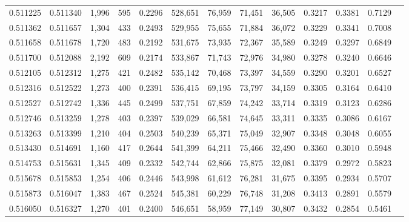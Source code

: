 \begin{tabular}{rrrrrrrrrrrrr}
0.511225 & 0.511340 &  1,996 &   595 &                                     0.2296 & 528,651 &  76,959 &  71,451 &  36,505 & 0.3217 & 0.3381 & 0.7129 \\
0.511362 & 0.511657 &  1,304 &   433 &                                     0.2493 & 529,955 &  75,655 &  71,884 &  36,072 & 0.3229 & 0.3341 & 0.7008 \\
0.511658 & 0.511678 &  1,720 &   483 &                                     0.2192 & 531,675 &  73,935 &  72,367 &  35,589 & 0.3249 & 0.3297 & 0.6849 \\
0.511700 & 0.512088 &  2,192 &   609 &                                     0.2174 & 533,867 &  71,743 &  72,976 &  34,980 & 0.3278 & 0.3240 & 0.6646 \\
0.512105 & 0.512312 &  1,275 &   421 &                                     0.2482 & 535,142 &  70,468 &  73,397 &  34,559 & 0.3290 & 0.3201 & 0.6527 \\
0.512316 & 0.512522 &  1,273 &   400 &                                     0.2391 & 536,415 &  69,195 &  73,797 &  34,159 & 0.3305 & 0.3164 & 0.6410 \\
0.512527 & 0.512742 &  1,336 &   445 &                                     0.2499 & 537,751 &  67,859 &  74,242 &  33,714 & 0.3319 & 0.3123 & 0.6286 \\
0.512746 & 0.513259 &  1,278 &   403 &                                     0.2397 & 539,029 &  66,581 &  74,645 &  33,311 & 0.3335 & 0.3086 & 0.6167 \\
0.513263 & 0.513399 &  1,210 &   404 &                                     0.2503 & 540,239 &  65,371 &  75,049 &  32,907 & 0.3348 & 0.3048 & 0.6055 \\
0.513430 & 0.514691 &  1,160 &   417 &                                     0.2644 & 541,399 &  64,211 &  75,466 &  32,490 & 0.3360 & 0.3010 & 0.5948 \\
0.514753 & 0.515631 &  1,345 &   409 &                                     0.2332 & 542,744 &  62,866 &  75,875 &  32,081 & 0.3379 & 0.2972 & 0.5823 \\
0.515678 & 0.515853 &  1,254 &   406 &                                     0.2446 & 543,998 &  61,612 &  76,281 &  31,675 & 0.3395 & 0.2934 & 0.5707 \\
0.515873 & 0.516047 &  1,383 &   467 &                                     0.2524 & 545,381 &  60,229 &  76,748 &  31,208 & 0.3413 & 0.2891 & 0.5579 \\
0.516050 & 0.516327 &  1,270 &   401 &                                     0.2400 & 546,651 &  58,959 &  77,149 &  30,807 & 0.3432 & 0.2854 & 0.5461 \\

\end{tabular}

